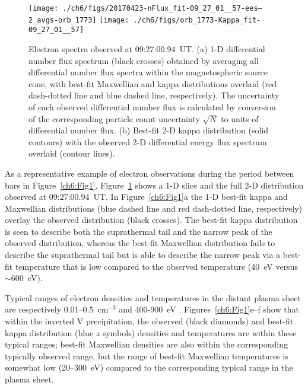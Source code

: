 
  \begin{figure}
    \centering
    \noindent\texttt{[image: ./ch6/figs/20170423-nFlux\_fit-09\_27\_01\_\_57-ees--2\_avgs-orb\_1773]}
    \noindent\texttt{[image: ./ch6/figs/orb\_1773-Kappa\_fit-09\_27\_01\_\_57]}
    \caption[Example of one- and two-dimensional fits of observed
    inverted-V electron distributions (Orbit 1773)]{Electron spectra
      observed at 09:27:00.94~UT. (a) 1-D differential number flux
      spectrum (black crosses) obtained by averaging all differential
      number flux spectra within the magnetospheric source cone, with
      best-fit Maxwellian and kappa distributions overlaid (red
      dash-dotted line and blue dashed line, respectively). The
      uncertainty of each observed differential number flux is
      calculated by conversion of the corresponding particle count
      uncertainty $\sqrt{N}$ to units of differential number flux. (b)
      Best-fit 2-D kappa distribution (solid contours) with the
      observed 2-D differential energy flux spectrum overlaid (contour
      lines). }
    \label{ch6:Fig2}
  \end{figure}


  As a representative example of electron observations during the
  period between bars in Figure~\ref{ch6:Fig1}, Figure~\ref{ch6:Fig2}
  shows a 1-D slice and the full 2-D distribution observed at
  09:27:00.94~UT.  In Figure~\ref{ch6:Fig1}a the 1-D best-fit kappa
  and Maxwellian distributions (blue dashed line and red dash-dotted
  line, respectively) overlay the observed distribution (black
  crosses). The best-fit kappa distribution is seen to describe both
  the suprathermal tail and the narrow peak of the observed
  distribution, whereas the best-fit Maxwellian distribution fails to
  describe the suprathermal tail but is able to describe the narrow
  peak via a best-fit temperature that is low compared to the observed
  temperature (40~eV versus $\sim$600~eV).

  Typical ranges of electron densities and temperatures in the distant
  plasma sheet are respectively 0.01--0.5~cm$^{-3}$ and 400-900~eV
  \citep{Kletzing2003,Paschmann2003}. Figures~\ref{ch6:Fig1}e--f show
  that within the inverted V precipitation, the observed (black
  diamonds) and best-fit kappa distribution (blue \emph{x} symbols)
  densities and temperatures are within these typical ranges; best-fit
  Maxwellian densities are also within the corresponding typically
  observed range, but the range of best-fit Maxwellian temperatures is
  somewhat low (20--300~eV) compared to the corresponding typical
  range in the plasma sheet. 

